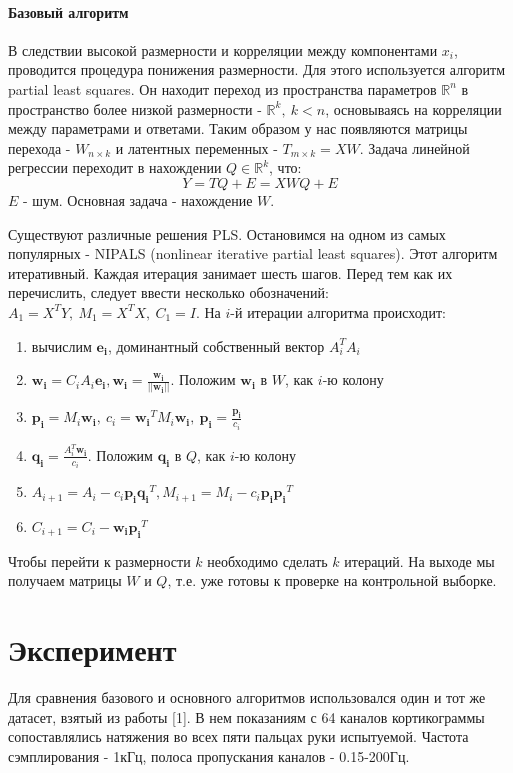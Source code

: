 \documentclass[12pt,twoside]{article}
\begin{document}
\paragraph{Базовый алгоритм}
В следствии высокой размерности и корреляции между компонентами $x_i$, проводится процедура понижения размерности. Для этого используется алгоритм partial least squares. Он находит переход из пространства параметров $\mathbb{R}^n$ в пространство более низкой размерности - $\mathbb{R}^k,\ k < n$, основываясь на корреляции между параметрами и ответами. Таким образом у нас появляются матрицы перехода - $W_{n \times k}$ и латентных переменных - $T_{m \times k} = X W$. Задача линейной регрессии переходит в нахождении $Q \in \mathbb{R}^k$, что:
$$Y = T Q + E = X W Q + E$$
$E$ - шум. Основная задача - нахождение $W$. \par
Существуют различные решения PLS. Остановимся на одном из самых популярных - NIPALS (nonlinear iterative partial least squares). Этот алгоритм итеративный. Каждая итерация занимает шесть шагов. Перед тем как их перечислить, следует ввести несколько обозначений: $A_1 = X^TY,\ M_1 = X^TX,\ C_1 = I$. На $i$-й итерации алгоритма происходит:
\begin{enumerate}
    \item вычислим $\pmb{e_i}$, доминантный собственный вектор $A_i^T A_i$
    \item $\pmb{w_i} = C_i A_i \pmb{e_i}, \pmb{w_i} = \frac{\pmb{w_i}}{||\pmb{w_i}||}$. Положим $\pmb{w_i}$ в $W$, как $i$-ю колону
    \item $\pmb{p_i} = M_i \pmb{w_i},\ c_i = \pmb{w_i}^T M_i \pmb{w_i},\ \pmb{p_i} = \frac{\pmb{p_i}}{c_i}$
    \item $\pmb{q_i} = \frac{A_i^T \pmb{w_i}}{c_i}$. Положим $\pmb{q_i}$ в $Q$, как $i$-ю колону
    \item $A_{i + 1} = A_i - c_i \pmb{p_i} \pmb{q_i}^T, M_{i + 1} = M_i - c_i \pmb{p_i} \pmb{p_i}^T$
    \item $C_{i + 1} = C_i - \pmb{w_i} \pmb{p_i}^T$
\end{enumerate}
 Чтобы перейти к размерности $k$ необходимо сделать $k$ итераций. На выходе мы получаем матрицы $W$ и $Q$, т.е. уже готовы к проверке на контрольной выборке.
 
 \section{Эксперимент}
 Для сравнения базового и основного алгоритмов использовался один и тот же датасет, взятый из работы [1]. В нем показаниям с 64 каналов кортикограммы сопоставлялись натяжения во всех пяти пальцах руки испытуемой. Частота сэмплирования - 1кГц, полоса пропускания каналов - 0.15-200Гц.
 
\end{document}
